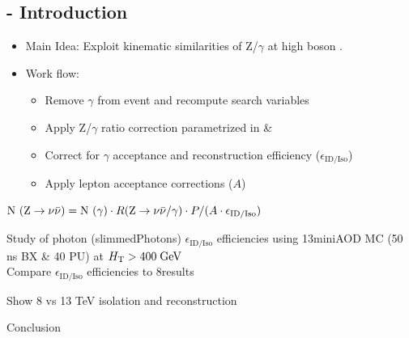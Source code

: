 \documentclass{beamer}
\begin{document}
\subsection{\photonJets - Introduction}
\begin{frame}
\begin{itemize}
 \item Main Idea: Exploit kinematic similarities of Z/$\gamma$ at high boson \pt.
 \item Work flow:
 \begin{itemize}
  \item Remove $\gamma$ from event and recompute search variables
  \item Apply Z/$\gamma$ ratio correction parametrized in \MHT \& \NJets
  \item Correct for $\gamma$ acceptance and reconstruction efficiency ($\epsilon_{\text{ID/Iso}}$)
  \item Apply lepton acceptance corrections ($A$)
 \end{itemize}
\end{itemize}
  \begin{centering}
  $\text{N }(\text{Z}\rightarrow\nu\bar{\nu}) = \text{N }(\gamma)\cdot R(\text{Z}\rightarrow\nu\bar{\nu}/\gamma)\cdot P/ (A\cdot \epsilon_{\text{ID/Iso}})$
  \end{centering}
\begin{block}{}
\centering
Study of photon (slimmedPhotons) $\epsilon_{\text{ID/Iso}}$ efficiencies using 13\tev miniAOD MC (50 ns BX \& 40 PU) at $H_{\text{T}}>400\;\text{Ge}\kern-0.06667em\text{V}$\\
Compare $\epsilon_{\text{ID/Iso}}$ efficiencies to 8\tev results
\end{block}

\end{frame}

\begin{frame}
Show 8 vs 13 TeV isolation and reconstruction
\end{frame}
\begin{frame}
 Conclusion
\end{frame}


\end{document}

